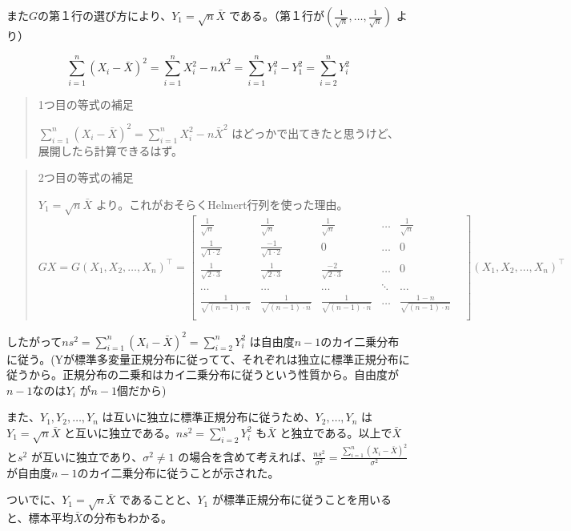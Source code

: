 \documentclass[
  letterpaper,
  DIV=11,
  numbers=noendperiod]{scrartcl}
\theoremstyle{plain}
\theoremstyle{remark}
\begin{document}
また\(G\)の第１行の選び方により、\(Y_1=\sqrt{n}\bar{X}\)
である。（第１行が\((\frac{1}{\sqrt{n}}, \dots,\frac{1}{\sqrt{n}})\)
より）

\[
\sum_{i=1}^n (X_i - \bar{X})^2= \sum_{i=1}^n X_i^2 - n \bar{X}^2 = \sum_{i=1}^n Y_i^2 - Y_1^2 = \sum_{i=2}^n Y_i^2
\]

\begin{quote}
1つ目の等式の補足

\(\sum_{i=1}^n (X_i - \bar{X})^2= \sum_{i=1}^n X_i^2 - n \bar{X}^2\)
はどっかで出てきたと思うけど、展開したら計算できるはず。
\end{quote}

\begin{quote}
2つ目の等式の補足

\(Y_1=\sqrt{n}\bar{X}\) より。これがおそらくHelmert行列を使った理由。
\(GX=G(X_1,X_2,\dots, X_n)^{\top} = \begin{bmatrix}
\frac{1}{\sqrt{n}} & \frac{1}{\sqrt{n}} &\frac{1}{\sqrt{n}} &\dots &\frac{1}{\sqrt{n}}\\
\frac{1}{\sqrt{1 \cdot 2}} & \frac{-1}{\sqrt{1 \cdot 2}}& 0 & \dots & 0\\
\frac{1}{\sqrt{2 \cdot 3}} & \frac{1}{\sqrt{2 \cdot 3}}& \frac{-2}{\sqrt{2 \cdot 3}}& \dots & 0\\
\dots &\dots&\dots& \ddots &\dots\\
\frac{1}{\sqrt{(n-1) \cdot n}}& \frac{1}{\sqrt{(n-1) \cdot n}}&
\frac{1}{\sqrt{(n-1) \cdot n}}& \dots & \frac{1-n}{\sqrt{(n-1) \cdot n}}& \\
\end{bmatrix}(X_1,X_2,\dots, X_n)^{\top}\)
\end{quote}

したがって\(ns^2=\sum_{i=1}^n (X_i - \bar{X})^2= \sum_{i=2}^n Y_i^2\)
は自由度\(n-1\)のカイ二乗分布に従う。(Yが標準多変量正規分布に従ってて、それぞれは独立に標準正規分布に従うから。正規分布の二乗和はカイ二乗分布に従うという性質から。自由度が\(n-1\)なのは\(Y_i\)
が\(n-1\)個だから)

また、\(Y_1, Y_2 , \dots, Y_n\)
は互いに独立に標準正規分布に従うため、\(Y_2, \dots, Y_n\)
は\(Y_1=\sqrt{n}\bar{X}\)
と互いに独立である。\(ns^2= \sum_{i=2}^n Y_i^2\) も\(\bar{X}\)
と独立である。以上で\(\bar{X}\)と\(s^2\)
が互いに独立であり、\(\sigma^2 \ne 1\)
の場合を含めて考えれば、\(\frac{ns^2}{\sigma^2}=\frac{\sum_{i=1}^n (X_i - \bar{X})^2}{\sigma^2}\)
が自由度\(n-1\)のカイ二乗分布に従うことが示された。

ついでに、\(Y_1=\sqrt{n}\bar{X}\) であることと、\(Y_1\)
が標準正規分布に従うことを用いると、標本平均\(\bar{X}\)の分布もわかる。
\end{document}
